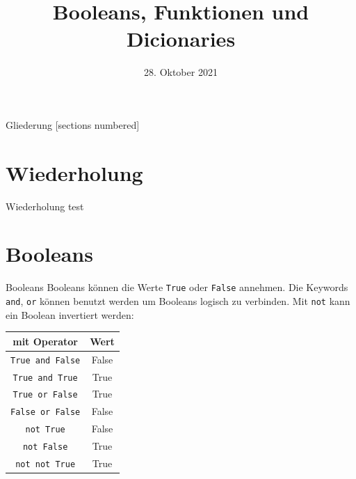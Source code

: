 



\title{Booleans, Funktionen und Dicionaries}
\date{28. Oktober 2021}

\usepackage{graphicx}
\usepackage{array}


	
\maketitle

\begin{frame}{Gliederung}
	[sections numbered]
	\tableofcontents
\end{frame}


\section{Wiederholung}
\begin{frame}{Wiederholung}
	test
\end{frame}

\section{Booleans}
\begin{frame}{Booleans}
	Booleans können die Werte \alert{\texttt{True}} oder \alert{\texttt{False}} annehmen.
	\linebreak
	Die Keywords \alert{\texttt{and}}, \alert{\texttt{or}} können benutzt werden um Booleans logisch zu verbinden.
	\linebreak
	Mit \alert{\texttt{not}} kann ein Boolean invertiert werden:

	\begin{center}
	\begin{tabular}{c | c}
		\hline\hline
		mit Operator & Wert \\
		\hline\hline
		\texttt{True and False} & False \\
		\texttt{True and True} & True \\
		\texttt{True or False} & True \\
		\texttt{False or False} & False \\
		\hline\hline
		\texttt{not True} & False \\
		\texttt{not False} & True \\
		\texttt{not not True} & True
	\end{tabular}
	\end{center}
\end{frame}

